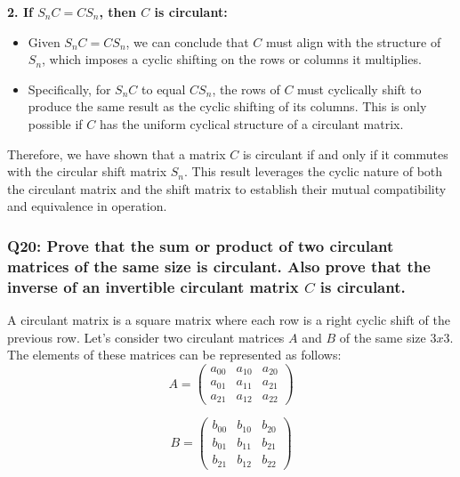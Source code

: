 \documentclass[8pt]{article}
\begin{document}
\textbf{2. If \(S_n C = C S_n\), then \(C\) is circulant:}
\begin{itemize}
    \item Given \(S_n C = C S_n\), we can conclude that \(C\) must align with the structure of \(S_n\), which imposes a cyclic shifting on the rows or columns it multiplies.
    \item Specifically, for \(S_n C\) to equal \(C S_n\), the rows of \(C\) must cyclically shift to produce the same result as the cyclic shifting of its columns. This is only possible if \(C\) has the uniform cyclical structure of a circulant matrix.
\end{itemize}

Therefore, we have shown that a matrix \(C\) is circulant if and only if it commutes with the circular shift matrix \(S_n\). This result leverages the cyclic nature of both the circulant matrix and the shift matrix to establish their mutual compatibility and equivalence in operation.

\subsubsection*{Q20:
Prove that the sum or product of two circulant matrices of the same size is circulant. Also prove that the inverse of an invertible circulant matrix \(C\) is circulant.}

A circulant matrix is a square matrix where each row is a right cyclic shift of the
previous row. Let's consider two circulant matrices $A$ and $B$ of the same size $3 x 3$. The elements of these matrices can be represented as follows:
$$
A= \begin{pmatrix}
a_{00} & a_{10} & a_{20} \\
a_{01} & a_{11} & a_{21} \\
a_{21} & a_{12} & a_{22}
\end{pmatrix}
$$

$$
B= \begin{pmatrix}
b_{00} & b_{10} & b_{20} \\
b_{01} & b_{11} & b_{21} \\
b_{21} & b_{12} & b_{22}
\end{pmatrix}
$$
\end{document}
